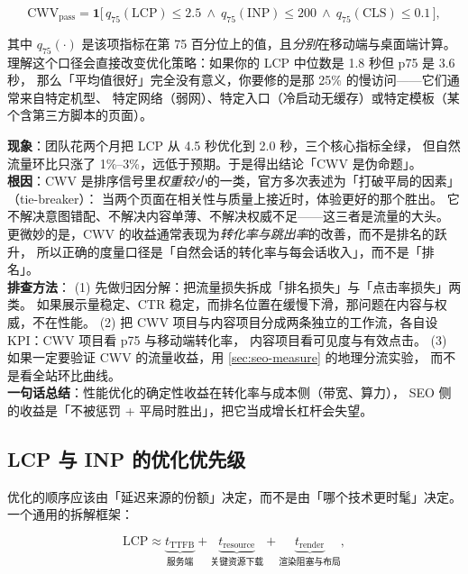 \begin{equation}
\text{CWV}_{\text{pass}} = \mathbf{1}\Big[\, q_{75}(\text{LCP}) \le 2.5 \ \wedge\ q_{75}(\text{INP}) \le 200 \ \wedge\ q_{75}(\text{CLS}) \le 0.1 \,\Big] ,
\label{eq:cwvthreshold}
\end{equation}

其中 $q_{75}(\cdot)$ 是该项指标在第 75 百分位上的值，且\emph{分别}在移动端与桌面端计算。
理解这个口径会直接改变优化策略：如果你的 LCP 中位数是 1.8 秒但 p75 是 3.6 秒，
那么「平均值很好」完全没有意义，你要修的是那 25\% 的慢访问——它们通常来自特定机型、
特定网络（弱网）、特定入口（冷启动无缓存）或特定模板（某个含第三方脚本的页面）。

\begin{pitfall}
\textbf{现象}：团队花两个月把 LCP 从 4.5 秒优化到 2.0 秒，三个核心指标全绿，
但自然流量环比只涨了 1\%--3\%，远低于预期。于是得出结论「CWV 是伪命题」。\\
\textbf{根因}：CWV 是排序信号里\emph{权重较小}的一类，官方多次表述为「打破平局的因素」（tie-breaker）：
当两个页面在相关性与质量上接近时，体验更好的那个胜出。
它不解决意图错配、不解决内容单薄、不解决权威不足——这三者是流量的大头。
更微妙的是，CWV 的收益通常表现为\emph{转化率与跳出率}的改善，而不是排名的跃升，
所以正确的度量口径是「自然会话的转化率与每会话收入」，而不是「排名」。\\
\textbf{排查方法}：
(1) 先做归因分解：把流量损失拆成「排名损失」与「点击率损失」两类。
      如果展示量稳定、CTR 稳定，而排名位置在缓慢下滑，那问题在内容与权威，不在性能。
(2) 把 CWV 项目与内容项目分成两条独立的工作流，各自设 KPI：CWV 项目看 p75 与移动端转化率，
      内容项目看可见度与有效点击。
(3) 如果一定要验证 CWV 的流量收益，用 \cref{sec:seo-measure} 的地理分流实验，
      而不是看全站环比曲线。
\\
\textbf{一句话总结}：性能优化的确定性收益在转化率与成本侧（带宽、算力），
SEO 侧的收益是「不被惩罚 + 平局时胜出」，把它当成增长杠杆会失望。
\end{pitfall}

\subsection{LCP 与 INP 的优化优先级}

优化的顺序应该由「延迟来源的份额」决定，而不是由「哪个技术更时髦」决定。一个通用的拆解框架：

\begin{equation}
\text{LCP} \approx \underbrace{t_{\text{TTFB}}}_{\text{服务端}} + \underbrace{t_{\text{resource}}}_{\text{关键资源下载}} + \underbrace{t_{\text{render}}}_{\text{渲染阻塞与布局}} ,
\label{eq:lcpdecompose}
\end{equation}


